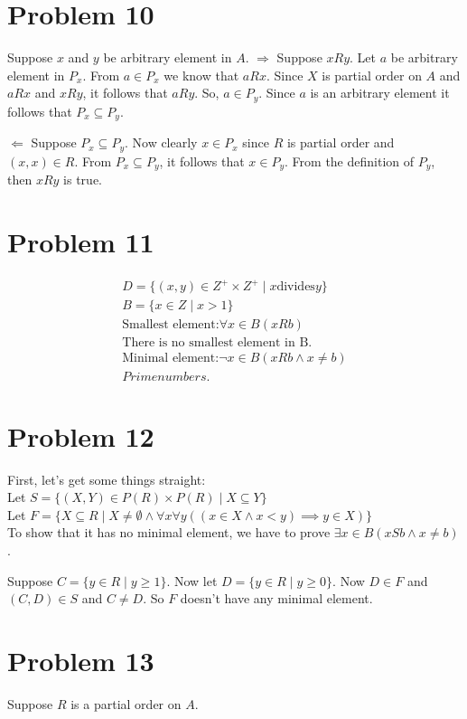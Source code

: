 \documentclass{article}
\begin{document}
\section{Problem 10}
Suppose $x$ and $y$ be arbitrary element in $A$.
$\Rightarrow$ Suppose $xRy$. Let $a$ be arbitrary element in $P_x$.
From $a \in P_x$ we know that $aRx$. Since $X$ is partial order on $A$
and $aRx$ and $xRy$, it follows that $aRy$. So, $a \in P_y$. Since $a$
is an arbitrary element it follows that $P_x \subseteq P_y$.

$\Leftarrow$ Suppose $P_x \subseteq P_y$. Now clearly $x \in P_x$
since $R$ is partial order and $(x,x) \in R$. From $P_x \subseteq
P_y$, it follows that $x \in P_y$. From the definition of $P_y$, then
$xRy$ is true.

\section{Problem 11}
\begin{align*}
  D = \{(x,y) \in Z^{+} \times Z^{+} \mid x \text{divides} y \} \\
  B = \{x \in Z \mid x > 1\} \\
  \text{Smallest element:} \forall x \in B(x R b) \\
  \text{There is no smallest element in B.} \\
  \text{Minimal element:} \neg x \in B(xRb \land x \neq b) \\
  Prime numbers.
\end{align*}

\section{Problem 12}
First, let's get some things straight: \\
Let $S = \{(X,Y) \in P(R) \times P(R) \mid X \subseteq Y\}$ \\
Let $F = \{X \subseteq R \mid X \neq \emptyset \land \forall x \forall
y ((x \in X \land x < y) \implies y \in X)\}$ \\

To show that it has no minimal element, we have to prove $\exists x
\in B(xSb \land x \neq b)$.

Suppose $C = \{y \in R \mid y \geq 1\}$. Now let $D = \{y \in R \mid y
\geq 0\}$. Now $D \in F$ and $(C,D) \in S$ and $C \neq D$. So $F$
doesn't have any minimal element.

\section{Problem 13}
Suppose $R$ is a partial order on $A$.
\end{document}

